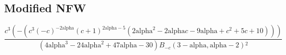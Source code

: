 \subsection{Modified NFW}

\begin{equation}
\frac{c^3 \left(-\left(c^3 (-c)^{-2 \text{alpha}} (c+1)^{2 \text{alpha}-5} \left(2 \text{alpha}^2-2 \text{alpha} c-9 \text{alpha}+c^2+5 c+10\right)\right)\right)}{\left(4 \text{alpha}^3-24 \text{alpha}^2+47 \text{alpha}-30\right) B_{-c}(3-\text{alpha},\text{alpha}-2){}^2}
\end{equation}